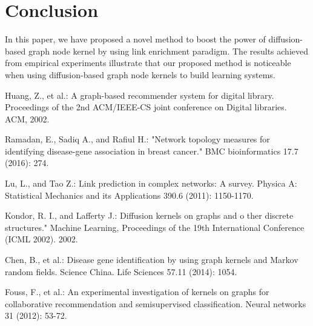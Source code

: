 \documentclass[runningheads,a4paper]{llncs}
\begin{document}
\section{Conclusion}
\label{conclusion}
In this paper, we have proposed a novel method to boost the power of diffusion-based graph node kernel by using link enrichment paradigm. The results achieved from empirical experiments illustrate that our proposed method is noticeable when using diffusion-based graph node kernels to build learning systems.


% 
% 

\begin{thebibliography}{4}

 Huang, Z., et al.: A graph-based recommender system for digital library. Proceedings of the 2nd ACM/IEEE-CS joint conference on Digital libraries. ACM, 2002. 

 Ramadan, E., Sadiq A., and Rafiul H.: "Network topology measures for identifying disease-gene association in breast cancer." BMC bioinformatics 17.7 (2016): 274.

 Lu, L., and Tao Z.: Link prediction in complex networks: A survey. Physica A: Statistical Mechanics and its Applications 390.6 (2011): 1150-1170.

 Kondor, R. I., and Lafferty J.: Diffusion kernels on graphs and o ther discrete structures." Machine Learning, Proceedings of the 19th International Conference (ICML 2002). 2002.

 Chen, B., et al.: Disease gene identification by using graph kernels and Markov random fields. Science China. Life Sciences 57.11 (2014): 1054.

 Fouss, F., et al.: An experimental investigation of kernels on graphs for collaborative recommendation and semisupervised classification. Neural networks 31 (2012): 53-72.

\end{thebibliography}
\end{document}
